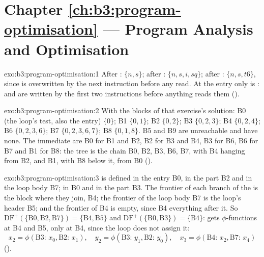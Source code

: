 \section*{Chapter \ref{ch:b3:program-optimisation} --- Program Analysis and Optimisation}

\begin{solution}{exo:b3:program-optimisation:1}
After : $\{n, s\}$; after : $\{n, s, i, sq\}$; after : $\{n, s, t6\}$, since  is overwritten by the next instruction before any read. At the entry only  is :  and  are written by the first two instructions before anything reads them ().
\end{solution}

\begin{solution}{exo:b3:program-optimisation:2}
With the blocks of that exercise's solution: B0 (the loop's test, also the entry) $\{0\}$; B1 $\{0, 1\}$; B2 $\{0, 2\}$; B3 $\{0, 2, 3\}$; B4 $\{0, 2, 4\}$; B6 $\{0, 2, 3, 6\}$; B7 $\{0, 2, 3, 6, 7\}$; B8 $\{0, 1, 8\}$. B5 and B9 are unreachable and have none. The immediate  are B0 for B1 and B2, B2 for B3 and B4, B3 for B6, B6 for B7 and B1 for B8: the  tree is the chain B0, B2, B3, B6, B7, with B4 hanging from B2, and B1, with B8 below it, from B0 ().
\end{solution}

\begin{solution}{exo:b3:program-optimisation:3}
 is defined in the entry B0, in the  part B2 and in the loop body B7;  in B0 and in the  part B3. The frontier of each branch of the  is the block where they join, B4; the frontier of the loop body B7 is the loop's header B5; and the frontier of B4 is empty, since B4  everything after it. So $\mathrm{DF}^{+}(\{\mathrm{B0}, \mathrm{B2}, \mathrm{B7}\}) = \{\mathrm{B4}, \mathrm{B5}\}$ and $\mathrm{DF}^{+}(\{\mathrm{B0}, \mathrm{B3}\}) = \{\mathrm{B4}\}$:  gets $\phi$-functions at B4 and B5,  only at B4, since the loop does not assign it:
\[ x_2 = \phi(\mathrm{B3}{:}\,x_0, \mathrm{B2}{:}\,x_1),\quad y_2 = \phi(\mathrm{B3}{:}\,y_1, \mathrm{B2}{:}\,y_0),\quad x_3 = \phi(\mathrm{B4}{:}\,x_2, \mathrm{B7}{:}\,x_4) \]
().
\end{solution}

